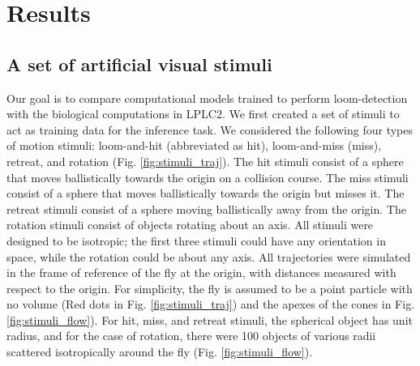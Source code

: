 \documentclass[pdftex,9pt,lineno]{elife}
\begin{document}
\section{Results}

\subsection{A set of artificial visual stimuli}





Our goal is to compare computational models trained to perform loom-detection with the biological computations in LPLC2. We first created a set of stimuli to act as training data for the inference task. We considered the following four types of motion stimuli: loom-and-hit (abbreviated as hit), loom-and-miss (miss), retreat, and rotation (Fig. \ref{fig:stimuli_traj}). The hit stimuli consist of a sphere that moves ballistically towards the origin on a collision course. The miss stimuli consist of a sphere that moves ballistically towards the origin but misses it. The retreat stimuli consist of a sphere moving ballistically away from the origin. The rotation stimuli consist of objects rotating about an axis. All stimuli were designed to be isotropic; the first three stimuli could have any orientation in space, while the rotation could be about any axis. All trajectories were simulated in the frame of reference of the fly at the origin, with distances measured with respect to the origin. For simplicity, the fly is assumed to be a point particle with no volume (Red dots in Fig. \ref{fig:stimuli_traj}) and the apexes of the cones in Fig. \ref{fig:stimuli_flow}). For hit, miss, and retreat stimuli, the spherical object has unit radius, and for the case of rotation, there were 100 objects of various radii scattered isotropically around the fly (Fig. \ref{fig:stimuli_flow}).

\end{document}

